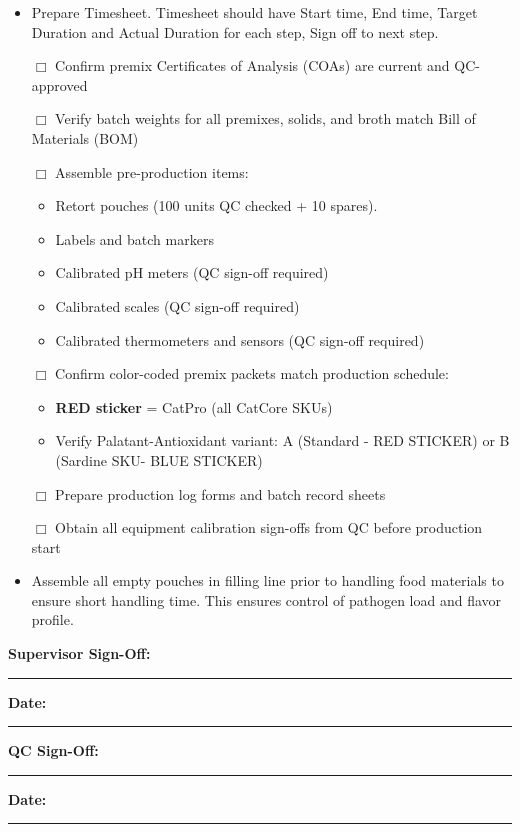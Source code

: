 \begin{itemize}[leftmargin=1.5em]
\item Prepare Timesheet. Timesheet should have Start time, End time, Target Duration and Actual Duration for each step, Sign off to next step. 
\item[$\Box$] Confirm premix Certificates of Analysis (COAs) are current and QC-approved
\item[$\Box$] Verify batch weights for all premixes, solids, and broth match Bill of Materials (BOM)
\item[$\Box$] Assemble pre-production items:
  \begin{itemize}
  \item Retort pouches (100 units QC checked + 10 spares). 
  \item Labels and batch markers
  \item Calibrated pH meters (QC sign-off required)
  \item Calibrated scales (QC sign-off required)
  \item Calibrated thermometers and sensors (QC sign-off required)
  \end{itemize}
\item[$\Box$] Confirm color-coded premix packets match production schedule:
  \begin{itemize}
  \item \textbf{RED sticker} = CatPro (all CatCore SKUs)
  \item Verify Palatant-Antioxidant variant: A (Standard - RED STICKER) or B (Sardine SKU- BLUE STICKER)
  \end{itemize}
\item[$\Box$] Prepare production log forms and batch record sheets
\item[$\Box$] Obtain all equipment calibration sign-offs from QC before production start
\item Assemble all empty pouches in filling line prior to handling food materials to ensure short handling time. This ensures control of pathogen load and flavor profile. 
\end{itemize}

\vspace{1em}
\noindent\textbf{Supervisor Sign-Off:} \rule{5cm}{0.4pt} \hspace{1cm} \textbf{Date:} \rule{3cm}{0.4pt}

\vspace{1em}
\noindent\textbf{QC Sign-Off:} \rule{5cm}{0.4pt} \hspace{1cm} \textbf{Date:} \rule{3cm}{0.4pt}

